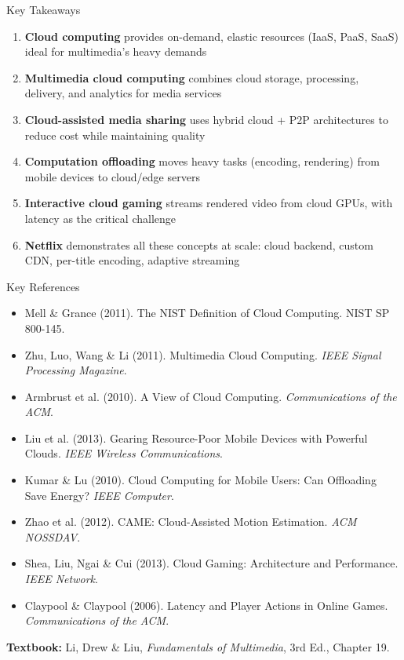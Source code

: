 \documentclass[aspectratio=169,12pt]{beamer}
\begin{document}
\begin{frame}{Key Takeaways}
    \begin{enumerate}
        \item \textbf{Cloud computing} provides on-demand, elastic resources (IaaS, PaaS, SaaS) ideal for multimedia's heavy demands
        
        \item \textbf{Multimedia cloud computing} combines cloud storage, processing, delivery, and analytics for media services
        
        \item \textbf{Cloud-assisted media sharing} uses hybrid cloud + P2P architectures to reduce cost while maintaining quality
        
        \item \textbf{Computation offloading} moves heavy tasks (encoding, rendering) from mobile devices to cloud/edge servers
        
        \item \textbf{Interactive cloud gaming} streams rendered video from cloud GPUs, with latency as the critical challenge
        
        \item \textbf{Netflix} demonstrates all these concepts at scale: cloud backend, custom CDN, per-title encoding, adaptive streaming
    \end{enumerate}
\end{frame}

\begin{frame}{Key References}
    \small
    \begin{itemize}
        \item Mell \& Grance (2011). The NIST Definition of Cloud Computing. NIST SP 800-145.
        \item Zhu, Luo, Wang \& Li (2011). Multimedia Cloud Computing. \textit{IEEE Signal Processing Magazine}.
        \item Armbrust et al. (2010). A View of Cloud Computing. \textit{Communications of the ACM}.
        \item Liu et al. (2013). Gearing Resource-Poor Mobile Devices with Powerful Clouds. \textit{IEEE Wireless Communications}.
        \item Kumar \& Lu (2010). Cloud Computing for Mobile Users: Can Offloading Save Energy? \textit{IEEE Computer}.
        \item Zhao et al. (2012). CAME: Cloud-Assisted Motion Estimation. \textit{ACM NOSSDAV}.
        \item Shea, Liu, Ngai \& Cui (2013). Cloud Gaming: Architecture and Performance. \textit{IEEE Network}.
        \item Claypool \& Claypool (2006). Latency and Player Actions in Online Games. \textit{Communications of the ACM}.
    \end{itemize}
    
    \vspace{0.2cm}
    \textbf{Textbook:} Li, Drew \& Liu, \textit{Fundamentals of Multimedia}, 3rd Ed., Chapter 19.
\end{frame}
\end{document}
